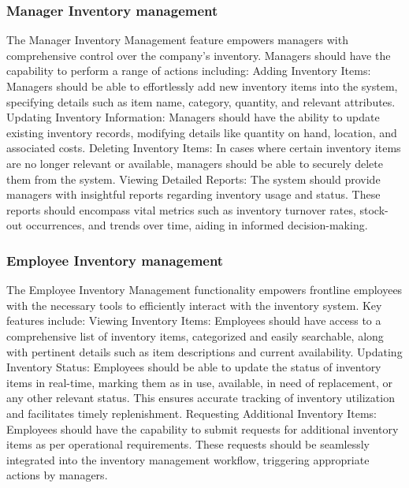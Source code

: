 \documentclass{article}
\begin{document}
	\subsubsection*{Manager Inventory management}	
	The Manager Inventory Management feature empowers managers with comprehensive control over the company's inventory. Managers should have the capability to perform a range of actions including:
	Adding Inventory Items: Managers should be able to effortlessly add new inventory items into the system, specifying details such as item name, category, quantity, and relevant attributes.
	Updating Inventory Information: Managers should have the ability to update existing inventory records, modifying details like quantity on hand, location, and associated costs.
	Deleting Inventory Items: In cases where certain inventory items are no longer relevant or available, managers should be able to securely delete them from the system.
	Viewing Detailed Reports: The system should provide managers with insightful reports regarding inventory usage and status. These reports should encompass vital metrics such as inventory turnover rates, stock-out occurrences, and trends over time, aiding in informed decision-making.
	\subsubsection*{Employee Inventory management}	
	The Employee Inventory Management functionality empowers frontline employees with the necessary tools to efficiently interact with the inventory system. Key features include:
	Viewing Inventory Items: Employees should have access to a comprehensive list of inventory items, categorized and easily searchable, along with pertinent details such as item descriptions and current availability.
	Updating Inventory Status: Employees should be able to update the status of inventory items in real-time, marking them as in use, available, in need of replacement, or any other relevant status. This ensures accurate tracking of inventory utilization and facilitates timely replenishment.
	Requesting Additional Inventory Items: Employees should have the capability to submit requests for additional inventory items as per operational requirements. These requests should be seamlessly integrated into the inventory management workflow, triggering appropriate actions by managers.
\end{document}
